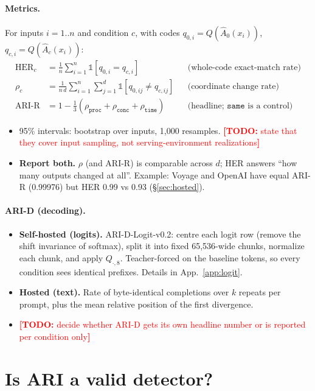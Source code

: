 \documentclass{article}
\newcommand{\todo}[1]{\textcolor{red}{\textbf{[TODO:} #1\textbf{]}}}
\begin{document}
\paragraph{Metrics.} For inputs $i=1..n$ and condition $c$, with codes $q_{0,i}=Q(\hat A_0(x_i))$, $q_{c,i}=Q(\hat A_c(x_i))$:
\begin{align}
  \mathrm{HER}_c &= \frac1n\sum_{i=1}^n \mathbb 1\!\left[q_{0,i}=q_{c,i}\right] && \text{(whole-code exact-match rate)}\\
  \rho_c &= \frac1{n\,d}\sum_{i=1}^n\sum_{j=1}^d \mathbb 1\!\left[q_{0,ij}\neq q_{c,ij}\right] && \text{(coordinate change rate)}\\
  \text{ARI-R} &= 1-\tfrac13\left(\rho_{\texttt{proc}}+\rho_{\texttt{conc}}+\rho_{\texttt{time}}\right) && \text{(headline; } \texttt{same} \text{ is a control)}
\end{align}
\begin{itemize}
  \item 95\% intervals: bootstrap over inputs, 1{,}000 resamples. \todo{state that they cover input sampling, not serving-environment realizations}
  \item \textbf{Report both.} $\rho$ (and ARI-R) is comparable across $d$; HER answers ``how many outputs changed at all''. Example: Voyage and OpenAI have equal ARI-R (0.99976) but HER 0.99 vs 0.93 (\S\ref{sec:hosted}).
\end{itemize}

\paragraph{ARI-D (decoding).}
\begin{itemize}
  \item \textbf{Self-hosted (logits).} ARI-D-Logit-v0.2: centre each logit row (remove the shift invariance of softmax), split it into fixed 65{,}536-wide chunks, normalize each chunk, and apply $Q_{\cdot,8}$. Teacher-forced on the baseline tokens, so every condition sees identical prefixes. Details in App.~\ref{app:logit}.
  \item \textbf{Hosted (text).} Rate of byte-identical completions over $k$ repeats per prompt, plus the mean relative position of the first divergence.
  \item \todo{decide whether ARI-D gets its own headline number or is reported per condition only}
\end{itemize}

\section{Is ARI a valid detector?}\label{sec:valid}
\end{document}
